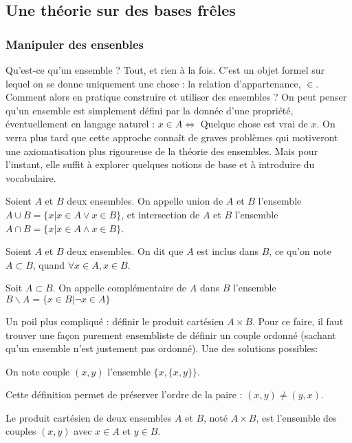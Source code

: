 \subsection{Une théorie sur des bases frêles}
\subsubsection{Manipuler des ensenbles}
Qu'est-ce qu'un ensemble ? Tout, et rien à la fois. C'est un objet formel sur lequel on se donne uniquement une chose : la relation d'appartenance, $\in$.
Comment alors en pratique construire et utiliser des ensembles ? On peut penser qu'un ensemble est simplement défini par la donnée d'une propriété, éventuellement en langage naturel : $x\in A \iff$ Quelque chose est vrai de $x$. On verra plus tard que cette approche connaît de graves problèmes qui motiveront une axiomatisation plus rigoureuse de la théorie des ensembles. Mais pour l'instant, elle suffit à explorer quelques notions de base et à introduire du vocabulaire.
\begin{defini}
	Soient $A$ et $B$ deux ensembles. On appelle union de $A$ et $B$ l'ensemble $A \cup B=\{x|x\in A \lor x \in B\}$, et intersection de $A$ et $B$ l'ensemble $A\cap B=\{x|x\in A \land x\in B\}$. 
\end{defini}
\begin{defini}
	Soient $A$ et $B$ deux ensembles. On dit que $A$ est inclus dans $B$, ce qu'on note $A\subset B$, quand $\forall x \in A, x\in B$.
\end{defini}
\begin{defini}
	Soit $A\subset B$. On appelle complémentaire de $A$ dans $B$ l'ensemble $B\backslash A = \{x\in B | \lnot x\in A\}$
\end{defini}
Un poil plus compliqué : définir le produit cartésien $A\times B$. Pour ce faire, il faut trouver une façon purement ensembliste de définir un couple ordonné (sachant qu'un ensemble n'est justement pas ordonné). Une des solutions possibles:
\begin{defini}
	On note couple $(x,y)$ l'ensemble $\{x, \{x,y\}\}$.
\end{defini}
Cette définition permet de préserver l'ordre de la paire : $(x,y)\neq (y,x)$.
\begin{defini}
	Le produit cartésien de deux ensembles $A$ et $B$, noté $A\times B$, est l'ensemble des couples $(x,y)$ avec $x\in A$ et $y\in B$.
\end{defini}

